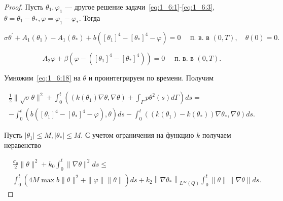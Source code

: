 \begin{proof}
    Пусть $\theta_{1}, \varphi_{1}$ — другое решение задачи~\eqref{eq:1_6:1}-\eqref{eq:1_6:3},
    $\theta=\theta_{1}-\theta_{*}, \varphi=\varphi_{1}-\varphi_{*}$.
    Тогда

    \begin{equation}
        \label{eq:1_6:18}
        \sigma \theta^{\prime}+A_{1}\left(\theta_{1}\right)-A_{1}\left(\theta_{*}\right)
        +b\left(\left[\theta_{1}\right]^{4}-\left[\theta_{*}\right]^{4}-\varphi\right)
        =0 \quad \text { п. в. в }(0, T), \quad \theta(0)=0.
    \end{equation}


    \begin{equation}
        \label{eq:1_6:19}
        A_{2} \varphi+\beta\left(\varphi
        -\left(\left[\theta_{1}\right]^{4}
        -\left[\theta_{*}\right]^{4}\right)\right)
        =0 \quad \text { п. в. в }(0, T).
    \end{equation}

    Умножим~\eqref{eq:1_6:18} на $\theta$ и проинтегрируем по времени.
    Получим

    \[
        \begin{gathered}
            \frac{1}{2}\|\sqrt{\sigma} \theta\|^{2}
            +\int_{0}^{t}\left(\left(k\left(\theta_{1}\right) \nabla \theta,
            \nabla \theta\right)+\int_{\Gamma} p \theta^{2}(s) d \Gamma\right) ds= \\
            -\int_{0}^{t}\left(b\left(\left[\theta_{1}\right]^{4}
            -\left[\theta_{*}\right]^{4}-\varphi\right), \theta\right) ds
            -\int_{0}^{t}\left(\left(k\left(\theta_{1}\right)
            -k\left(\theta_{*}\right)\right) \nabla \theta_{*}, \nabla \theta\right) ds.
        \end{gathered}
    \]


    Пусть $\left|\theta_{1}\right| \leq M,\left|\theta_{*}\right| \leq M$.
    С учетом ограничения на функцию $k$ получаем неравенство

    \begin{equation}
        \label{eq:1_6:20}
        \begin{aligned}
            &\frac{\sigma_{0}}{2}\|\theta\|^{2}+k_{0} \int_{0}^{t}\|\nabla \theta\|^{2} d s \leq \\
            & \int_{0}^{t}\left(4 M \max b\|\theta\|^{2}+\|\varphi\|\|\theta\|\right) d s
            +k_{2}\left\|\nabla \theta_{*}\right\|_{L^{\infty}(Q)} \int_{0}^{t}\|\theta\|\|\nabla \theta\| d s.
        \end{aligned}
    \end{equation}


\end{proof}
